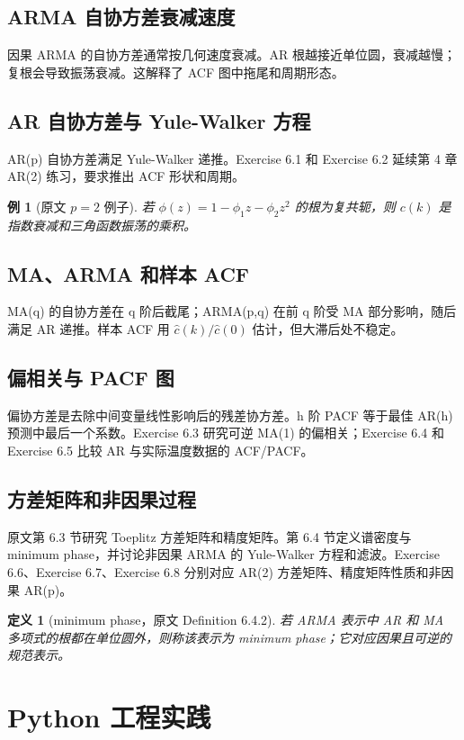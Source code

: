 \documentclass[11pt,a4paper,openany]{ctexbook}
\newtheorem{definition}{定义}[section]
\newtheorem{example}{例}[section]
\begin{document}
\subsection{ARMA 自协方差衰减速度}
因果 ARMA 的自协方差通常按几何速度衰减。AR 根越接近单位圆，衰减越慢；复根会导致振荡衰减。这解释了 ACF 图中拖尾和周期形态。

\subsection{AR 自协方差与 Yule-Walker 方程}
AR(p) 自协方差满足 Yule-Walker 递推。Exercise 6.1 和 Exercise 6.2 延续第 4 章 AR(2) 练习，要求推出 ACF 形状和周期。

\begin{example}[原文 \(p=2\) 例子]
若 \(\phi(z)=1-\phi_1z-\phi_2z^2\) 的根为复共轭，则 \(c(k)\) 是指数衰减和三角函数振荡的乘积。
\end{example}

\subsection{MA、ARMA 和样本 ACF}
MA(q) 的自协方差在 q 阶后截尾；ARMA(p,q) 在前 q 阶受 MA 部分影响，随后满足 AR 递推。样本 ACF 用 \(\hat c(k)/\hat c(0)\) 估计，但大滞后处不稳定。

\subsection{偏相关与 PACF 图}
偏协方差是去除中间变量线性影响后的残差协方差。h 阶 PACF 等于最佳 AR(h) 预测中最后一个系数。Exercise 6.3 研究可逆 MA(1) 的偏相关；Exercise 6.4 和 Exercise 6.5 比较 AR 与实际温度数据的 ACF/PACF。

\subsection{方差矩阵和非因果过程}
原文第 6.3 节研究 Toeplitz 方差矩阵和精度矩阵。第 6.4 节定义谱密度与 minimum phase，并讨论非因果 ARMA 的 Yule-Walker 方程和滤波。Exercise 6.6、Exercise 6.7、Exercise 6.8 分别对应 AR(2) 方差矩阵、精度矩阵性质和非因果 AR(p)。

\begin{definition}[minimum phase，原文 Definition 6.4.2]
若 ARMA 表示中 AR 和 MA 多项式的根都在单位圆外，则称该表示为 minimum phase；它对应因果且可逆的规范表示。
\end{definition}

\section{Python 工程实践}
\end{document}
